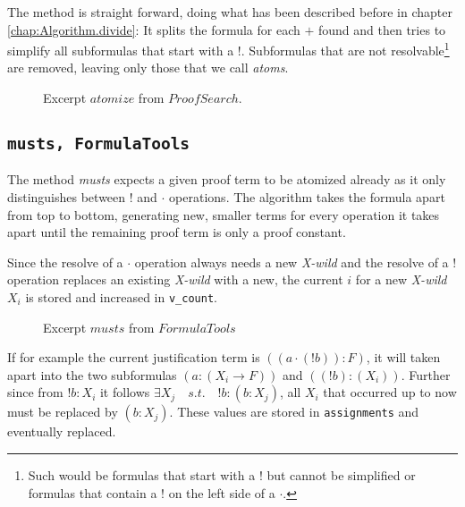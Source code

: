 The method is straight forward, doing what has been described before in chapter \ref{chap:Algorithm.divide}: It splits the formula for each $+$ found and then tries to simplify all subformulas that start with a $!$. Subformulas that are not resolvable\footnote{Such would be formulas that start with a $!$ but cannot be simplified or formulas that contain a $!$ on the left side of a $\cdot$.} are removed, leaving only those that we call \emph{atoms}.

\begin{figure}[H]
	\caption{Excerpt $atomize$ from $ProofSearch$.}
    \vspace{-10pt}
	
	\vspace{-10pt}
\end{figure}

\subsection[musts]{\texttt{musts, FormulaTools}}
The method \emph{musts} expects a given proof term to be atomized already as it only distinguishes between $!$ and $\cdot$ operations.
The algorithm takes the formula apart from top to bottom, generating new, smaller terms for every operation it takes apart until the remaining proof term is only a proof constant. 

Since the resolve of a $\cdot$ operation always needs a new \emph{X-wild} and the resolve of a $!$ operation replaces an existing \emph{X-wild} with a new, the current $i$ for a new \emph{X-wild} $X_i$ is stored and increased in \texttt{v\_count}.

\begin{figure}[H]
	\caption{Excerpt $musts$ from $FormulaTools$}
    \vspace{-10pt}
	
	\vspace{-10pt}
\end{figure}

If for example the current justification term is $((a\cdot (!b)):F)$, it will taken apart into the two subformulas $(a:(X_i\rightarrow F))$ and $((!b):(X_i))$. Further since from $!b:X_i$ it follows $\exists X_j \quad s.t. \quad !b:(b:X_j)$, all $X_i$ that occurred up to now must be replaced by $(b:X_j)$. These values are stored in \texttt{assignments} and eventually replaced.

